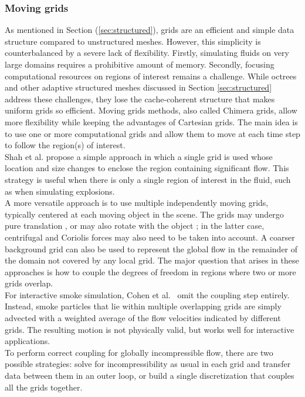 \subsubsection{Moving grids}
\label{sec:movingMesh}
As mentioned in Section (\ref{sec:structured}), grids are an efficient and simple data structure compared to unstructured meshes. However, this simplicity is counterbalanced by a severe lack of flexibility. Firstly, simulating fluids on very large domains requires a prohibitive amount of memory. Secondly, focusing computational resources on regions of interest remains a challenge.
While octrees and other adaptive structured meshes discussed in Section \ref{sec:structured} address these challenges, they lose the cache-coherent structure that makes uniform grids so efficient.
Moving grids methods, also called Chimera grids, allow more flexibility while keeping the advantages of Cartesian grids. The main idea is to use one or more computational grids and allow them to move at each time step to follow the region(s) of interest.
\\
Shah et al. \cite{Shah2004} propose a simple approach in which a single grid is used whose location and size changes to enclose the region containing significant flow.
This strategy is useful when there is only a single region of interest in the fluid, such as when simulating explosions.
\\
A more versatile approach is to use multiple independently moving grids, typically centered at each moving object in the scene.
The grids may undergo pure translation \cite{Cohen2010}, or may also rotate with the object \cite{Dobashi2008:adaptiveGrid,English2013}; in the latter case, centrifugal and Coriolis forces may also need to be taken into account.
A coarser background grid can also be used to represent the global flow in the remainder of the domain not covered by any local grid.
The major question that arises in these approaches is how to couple the degrees of freedom in regions where two or more grids overlap.
\\
For interactive smoke simulation, Cohen et al.~\cite{Cohen2010} omit the coupling step entirely.
Instead, smoke particles that lie within multiple overlapping grids are simply advected with a weighted average of the flow velocities indicated by different grids.
The resulting motion is not physically valid, but works well for interactive applications.
\\
To perform correct coupling for globally incompressible flow, there are two possible strategies: solve for incompressibility as usual in each grid and transfer data between them in an outer loop, or build a single discretization that couples all the grids together.
